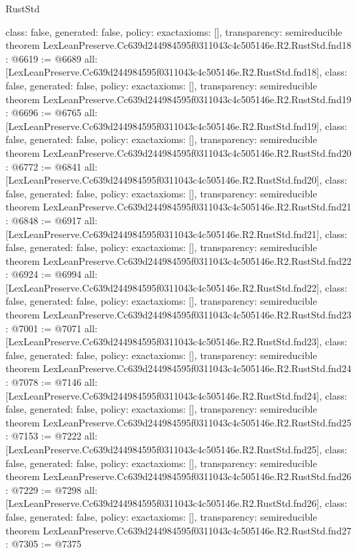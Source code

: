 \begin{lexlean}{RustStd}
\begin{coremodule}
{  class: false,
  generated: false,
  policy: exact{axioms: []},
  transparency: semireducible
}
theorem LexLeanPreserve.Cc639d244984595f0311043c4c505146e.R2.RustStd.fnd18 : @6619 := @6689 {
  all: [LexLeanPreserve.Cc639d244984595f0311043c4c505146e.R2.RustStd.fnd18],
  class: false,
  generated: false,
  policy: exact{axioms: []},
  transparency: semireducible
}
theorem LexLeanPreserve.Cc639d244984595f0311043c4c505146e.R2.RustStd.fnd19 : @6696 := @6765 {
  all: [LexLeanPreserve.Cc639d244984595f0311043c4c505146e.R2.RustStd.fnd19],
  class: false,
  generated: false,
  policy: exact{axioms: []},
  transparency: semireducible
}
theorem LexLeanPreserve.Cc639d244984595f0311043c4c505146e.R2.RustStd.fnd20 : @6772 := @6841 {
  all: [LexLeanPreserve.Cc639d244984595f0311043c4c505146e.R2.RustStd.fnd20],
  class: false,
  generated: false,
  policy: exact{axioms: []},
  transparency: semireducible
}
theorem LexLeanPreserve.Cc639d244984595f0311043c4c505146e.R2.RustStd.fnd21 : @6848 := @6917 {
  all: [LexLeanPreserve.Cc639d244984595f0311043c4c505146e.R2.RustStd.fnd21],
  class: false,
  generated: false,
  policy: exact{axioms: []},
  transparency: semireducible
}
theorem LexLeanPreserve.Cc639d244984595f0311043c4c505146e.R2.RustStd.fnd22 : @6924 := @6994 {
  all: [LexLeanPreserve.Cc639d244984595f0311043c4c505146e.R2.RustStd.fnd22],
  class: false,
  generated: false,
  policy: exact{axioms: []},
  transparency: semireducible
}
theorem LexLeanPreserve.Cc639d244984595f0311043c4c505146e.R2.RustStd.fnd23 : @7001 := @7071 {
  all: [LexLeanPreserve.Cc639d244984595f0311043c4c505146e.R2.RustStd.fnd23],
  class: false,
  generated: false,
  policy: exact{axioms: []},
  transparency: semireducible
}
theorem LexLeanPreserve.Cc639d244984595f0311043c4c505146e.R2.RustStd.fnd24 : @7078 := @7146 {
  all: [LexLeanPreserve.Cc639d244984595f0311043c4c505146e.R2.RustStd.fnd24],
  class: false,
  generated: false,
  policy: exact{axioms: []},
  transparency: semireducible
}
theorem LexLeanPreserve.Cc639d244984595f0311043c4c505146e.R2.RustStd.fnd25 : @7153 := @7222 {
  all: [LexLeanPreserve.Cc639d244984595f0311043c4c505146e.R2.RustStd.fnd25],
  class: false,
  generated: false,
  policy: exact{axioms: []},
  transparency: semireducible
}
theorem LexLeanPreserve.Cc639d244984595f0311043c4c505146e.R2.RustStd.fnd26 : @7229 := @7298 {
  all: [LexLeanPreserve.Cc639d244984595f0311043c4c505146e.R2.RustStd.fnd26],
  class: false,
  generated: false,
  policy: exact{axioms: []},
  transparency: semireducible
}
theorem LexLeanPreserve.Cc639d244984595f0311043c4c505146e.R2.RustStd.fnd27 : @7305 := @7375 {
}
\end{coremodule}
\end{lexlean}
